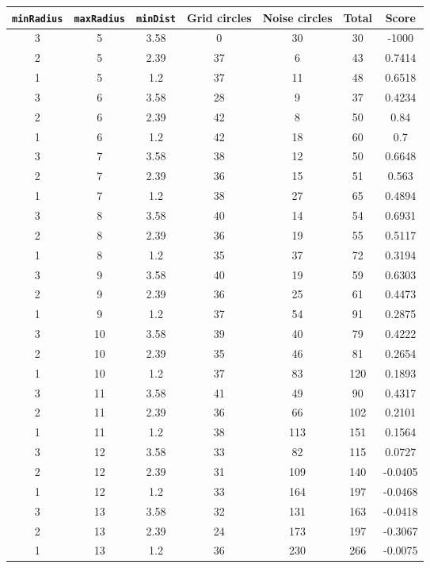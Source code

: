 \documentclass[letterpaper, 12pt]{article}
\begin{document}
\begin{longtable}{|c|c|c|c|c|c|c|}
\hline
\textbf{\texttt{minRadius}} & \textbf{\texttt{maxRadius}} & \textbf{\texttt{minDist}} & \textbf{Grid circles} & \textbf{Noise circles} & \textbf{Total} & \textbf{Score} \\
\hline
3 & 5 & 3.58 & 0 & 30 & 30 & -1000 \\
\hline
2 & 5 & 2.39 & 37 & 6 & 43 & 0.7414 \\
\hline
1 & 5 & 1.2 & 37 & 11 & 48 & 0.6518 \\
\hline
3 & 6 & 3.58 & 28 & 9 & 37 & 0.4234 \\
\hline
2 & 6 & 2.39 & 42 & 8 & 50 & 0.84 \\
\hline
1 & 6 & 1.2 & 42 & 18 & 60 & 0.7 \\
\hline
3 & 7 & 3.58 & 38 & 12 & 50 & 0.6648 \\
\hline
2 & 7 & 2.39 & 36 & 15 & 51 & 0.563 \\
\hline
1 & 7 & 1.2 & 38 & 27 & 65 & 0.4894 \\
\hline
3 & 8 & 3.58 & 40 & 14 & 54 & 0.6931 \\
\hline
2 & 8 & 2.39 & 36 & 19 & 55 & 0.5117 \\
\hline
1 & 8 & 1.2 & 35 & 37 & 72 & 0.3194 \\
\hline
3 & 9 & 3.58 & 40 & 19 & 59 & 0.6303 \\
\hline
2 & 9 & 2.39 & 36 & 25 & 61 & 0.4473 \\
\hline
1 & 9 & 1.2 & 37 & 54 & 91 & 0.2875 \\
\hline
3 & 10 & 3.58 & 39 & 40 & 79 & 0.4222 \\
\hline
2 & 10 & 2.39 & 35 & 46 & 81 & 0.2654 \\
\hline
1 & 10 & 1.2 & 37 & 83 & 120 & 0.1893 \\
\hline
3 & 11 & 3.58 & 41 & 49 & 90 & 0.4317 \\
\hline
2 & 11 & 2.39 & 36 & 66 & 102 & 0.2101 \\
\hline
1 & 11 & 1.2 & 38 & 113 & 151 & 0.1564 \\
\hline
3 & 12 & 3.58 & 33 & 82 & 115 & 0.0727 \\
\hline
2 & 12 & 2.39 & 31 & 109 & 140 & -0.0405 \\
\hline
1 & 12 & 1.2 & 33 & 164 & 197 & -0.0468 \\
\hline
3 & 13 & 3.58 & 32 & 131 & 163 & -0.0418 \\
\hline
2 & 13 & 2.39 & 24 & 173 & 197 & -0.3067 \\
\hline
1 & 13 & 1.2 & 36 & 230 & 266 & -0.0075 \\

\end{longtable}
\end{document}
